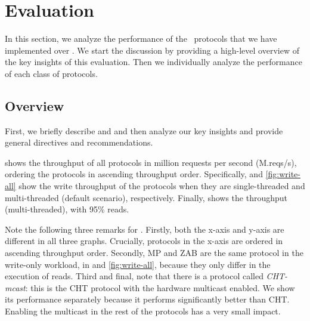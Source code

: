
\section{Evaluation}
\label{sec:ev}

In this section, we analyze the performance of the \pnum~protocols that we have implemented over \odlib.
We start the discussion by providing a high-level overview of the 
key insights of this evaluation.
Then we individually analyze the performance of each class of protocols. 

\subsection{Overview} 
\label{sec:ev:ov}


% 

First, we briefly describe  and  and then analyze our key insights and provide general directives and recommendations. 

 shows the throughput of all protocols in million requests per second (M.reqs/s), ordering the protocols in ascending throughput order. 
Specifically,  and \ref{fig:write-all} show the write throughput of the protocols when they are single-threaded and multi-threaded (default scenario), respectively.
Finally,  shows the throughput (multi-threaded), with 95\% reads.




Note the following three remarks for .
Firstly, both the x-axis and y-axis are different in all three graphs. Crucially, protocols in the x-axis are ordered in ascending throughput order.
Secondly, MP and ZAB are the same protocol in the write-only workload, \ie in  and \ref{fig:write-all}, because they only differ in the execution of reads.
Third and final, note that there is a protocol called \emph{CHT-mcast}: this is the CHT protocol with the hardware multicast enabled. We show its performance separately because it performs significantly better than CHT. Enabling the multicast in the rest of the protocols has a very small impact. %

